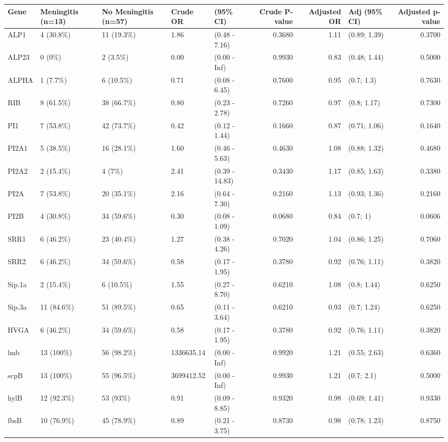 \begin{table}[ht]
\centering
\begin{tabular}{lllllrrlr}
  \hline
Gene & Meningitis (n=13) & No Meningitis (n=57) & Crude OR & (95\% CI) & Crude P-value & Adjusted OR & Adj (95\% CI) & Adjusted p-value \\ 
  \hline
ALP1 & 4 (30.8\%) & 11 (19.3\%) & 1.86 & (0.48 - 7.16) & 0.3680 & 1.11 & (0.89; 1.39) & 0.3700 \\ 
  ALP23 & 0 (0\%) & 2 (3.5\%) & 0.00 & (0.00 - Inf) & 0.9930 & 0.83 & (0.48; 1.44) & 0.5000 \\ 
  ALPHA & 1 (7.7\%) & 6 (10.5\%) & 0.71 & (0.08 - 6.45) & 0.7600 & 0.95 & (0.7; 1.3) & 0.7630 \\ 
  RIB & 8 (61.5\%) & 38 (66.7\%) & 0.80 & (0.23 - 2.78) & 0.7260 & 0.97 & (0.8; 1.17) & 0.7300 \\ 
  PI1 & 7 (53.8\%) & 42 (73.7\%) & 0.42 & (0.12 - 1.44) & 0.1660 & 0.87 & (0.71; 1.06) & 0.1640 \\ 
  PI2A1 & 5 (38.5\%) & 16 (28.1\%) & 1.60 & (0.46 - 5.63) & 0.4630 & 1.08 & (0.88; 1.32) & 0.4680 \\ 
  PI2A2 & 2 (15.4\%) & 4 (7\%) & 2.41 & (0.39 - 14.83) & 0.3430 & 1.17 & (0.85; 1.63) & 0.3380 \\ 
  PI2A & 7 (53.8\%) & 20 (35.1\%) & 2.16 & (0.64 - 7.30) & 0.2160 & 1.13 & (0.93; 1.36) & 0.2160 \\ 
  PI2B & 4 (30.8\%) & 34 (59.6\%) & 0.30 & (0.08 - 1.09) & 0.0680 & 0.84 & (0.7; 1) & 0.0606 \\ 
  SRR1 & 6 (46.2\%) & 23 (40.4\%) & 1.27 & (0.38 - 4.26) & 0.7020 & 1.04 & (0.86; 1.25) & 0.7060 \\ 
  SRR2 & 6 (46.2\%) & 34 (59.6\%) & 0.58 & (0.17 - 1.95) & 0.3780 & 0.92 & (0.76; 1.11) & 0.3820 \\ 
  Sip.1a & 2 (15.4\%) & 6 (10.5\%) & 1.55 & (0.27 - 8.70) & 0.6210 & 1.08 & (0.8; 1.44) & 0.6250 \\ 
  Sip.3a & 11 (84.6\%) & 51 (89.5\%) & 0.65 & (0.11 - 3.64) & 0.6210 & 0.93 & (0.7; 1.24) & 0.6250 \\ 
  HVGA & 6 (46.2\%) & 34 (59.6\%) & 0.58 & (0.17 - 1.95) & 0.3780 & 0.92 & (0.76; 1.11) & 0.3820 \\ 
  lmb & 13 (100\%) & 56 (98.2\%) & 1336635.14 & (0.00 - Inf) & 0.9920 & 1.21 & (0.55; 2.63) & 0.6360 \\ 
  scpB & 13 (100\%) & 55 (96.5\%) & 3699412.52 & (0.00 - Inf) & 0.9930 & 1.21 & (0.7; 2.1) & 0.5000 \\ 
  hylB & 12 (92.3\%) & 53 (93\%) & 0.91 & (0.09 - 8.85) & 0.9320 & 0.98 & (0.69; 1.41) & 0.9330 \\ 
  fbsB & 10 (76.9\%) & 45 (78.9\%) & 0.89 & (0.21 - 3.75) & 0.8730 & 0.98 & (0.78; 1.23) & 0.8750 \\ 
   \hline
\end{tabular}
\end{table}
